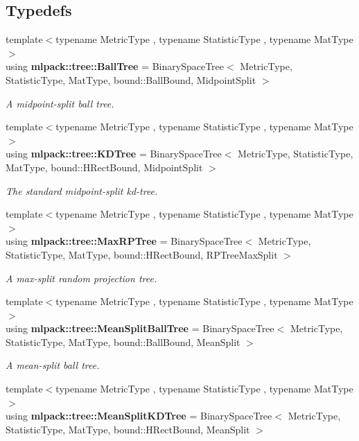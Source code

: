 \subsection*{Typedefs}
\begin{DoxyCompactItemize}
\item 
{\footnotesize template$<$typename Metric\+Type , typename Statistic\+Type , typename Mat\+Type $>$ }\\using {\bf mlpack\+::tree\+::\+Ball\+Tree} = Binary\+Space\+Tree$<$ Metric\+Type, Statistic\+Type, Mat\+Type, bound\+::\+Ball\+Bound, Midpoint\+Split $>$
\begin{DoxyCompactList}\small\item\em A midpoint-\/split ball tree. \end{DoxyCompactList}\item 
{\footnotesize template$<$typename Metric\+Type , typename Statistic\+Type , typename Mat\+Type $>$ }\\using {\bf mlpack\+::tree\+::\+K\+D\+Tree} = Binary\+Space\+Tree$<$ Metric\+Type, Statistic\+Type, Mat\+Type, bound\+::\+H\+Rect\+Bound, Midpoint\+Split $>$
\begin{DoxyCompactList}\small\item\em The standard midpoint-\/split kd-\/tree. \end{DoxyCompactList}\item 
{\footnotesize template$<$typename Metric\+Type , typename Statistic\+Type , typename Mat\+Type $>$ }\\using {\bf mlpack\+::tree\+::\+Max\+R\+P\+Tree} = Binary\+Space\+Tree$<$ Metric\+Type, Statistic\+Type, Mat\+Type, bound\+::\+H\+Rect\+Bound, R\+P\+Tree\+Max\+Split $>$
\begin{DoxyCompactList}\small\item\em A max-\/split random projection tree. \end{DoxyCompactList}\item 
{\footnotesize template$<$typename Metric\+Type , typename Statistic\+Type , typename Mat\+Type $>$ }\\using {\bf mlpack\+::tree\+::\+Mean\+Split\+Ball\+Tree} = Binary\+Space\+Tree$<$ Metric\+Type, Statistic\+Type, Mat\+Type, bound\+::\+Ball\+Bound, Mean\+Split $>$
\begin{DoxyCompactList}\small\item\em A mean-\/split ball tree. \end{DoxyCompactList}\item 
{\footnotesize template$<$typename Metric\+Type , typename Statistic\+Type , typename Mat\+Type $>$ }\\using {\bf mlpack\+::tree\+::\+Mean\+Split\+K\+D\+Tree} = Binary\+Space\+Tree$<$ Metric\+Type, Statistic\+Type, Mat\+Type, bound\+::\+H\+Rect\+Bound, Mean\+Split $>$

\end{DoxyCompactItemize}
